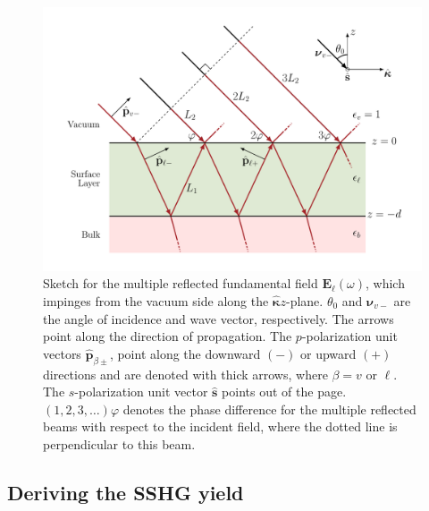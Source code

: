 \begin{figure}[t]
\centering 
\includegraphics[scale=0.6]{content/figures/diag-3layer_MR_1w}
\caption[Sketch for the multiple reflected, $1\omega$ incoming field.]
{Sketch for the multiple reflected fundamental field
$\mathbf{E}_{\ell}(\omega)$, which impinges from the vacuum side along the
$\hat{\boldsymbol{\kappa}}z$-plane. $\theta_{0}$ and $\boldsymbol{\nu}_{v-}$ are
the angle of incidence and wave vector, respectively. The arrows point along the
direction of propagation. The $p$-polarization unit vectors
$\hat{\mathbf{p}}_{\beta\pm}$, point along the downward $(-)$ or upward $(+)$
directions and are denoted with thick arrows, where $\beta = v$ or $\ell$. The
$s$-polarization unit vector $\hat{\mathbf{s}}$ points out of the page.
$(1,2,3,\ldots)\varphi$ denotes the phase difference for the multiple reflected
beams with respect to the incident field, where the dotted line is perpendicular
to this beam.}
\label{fig:MR3layer1w}
\end{figure}



\subsection{Deriving the SSHG yield}

